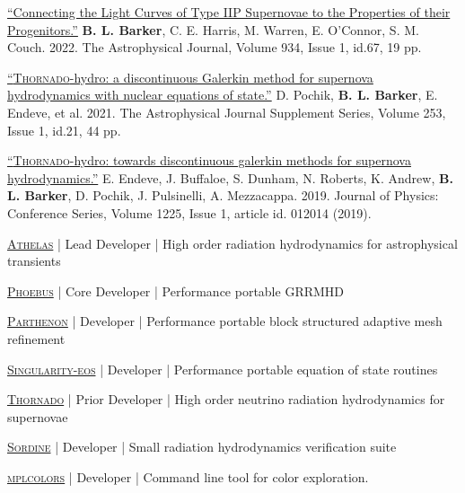 \documentclass[11pt]{vitae}
\begin{document}
\begin{publist}
\item \href{https://doi.org/10.3847/1538-4357/ac77f3}{``Connecting the Light Curves of Type IIP Supernovae to the Properties of their Progenitors.''} \textbf{B. L. Barker}, C. E. Harris, M. Warren, E. O'Connor, S. M. Couch. 2022. The Astrophysical Journal, Volume 934, Issue 1, id.67, 19 pp.

\item \href{https://iopscience.iop.org/article/10.3847/1538-4365/abd700}{``\textsc{Thornado}-hydro: a discontinuous Galerkin method for supernova hydrodynamics with nuclear equations of state.''} D. Pochik, \textbf{B. L. Barker}, E. Endeve, et al. 2021. The Astrophysical Journal Supplement Series, Volume 253, Issue 1, id.21, 44 pp.

\item \href{https://doi.org/10.1088/1742-6596/1225/1/012014}{``\textsc{Thornado}-hydro: towards discontinuous galerkin methods for supernova hydrodynamics.''} E. Endeve, J. Buffaloe, S. Dunham, N. Roberts, K. Andrew, \textbf{B. L. Barker}, D. Pochik, J. Pulsinelli, A. Mezzacappa. 2019. Journal of Physics: Conference Series, Volume 1225, Issue 1, article id. 012014 (2019).

\end{publist}

\begin{genericlist}
\item \href{https://github.com/astrobarker/athelas}{\textsc{Athelas}} | Lead Developer | 
  High order radiation hydrodynamics for astrophysical transients
\item \href{https://github.com/lanl/phoebus}{\textsc{Phoebus}} | Core Developer | 
  Performance portable GRRMHD
\item \href{https://github.com/parthenon-hpc-lab/parthenon}{\textsc{Parthenon}} | Developer | 
  Performance portable block structured adaptive mesh refinement
\item \href{https://github.com/lanl/singularity-eos}{\textsc{Singularity-eos}} | Developer | 
  Performance portable equation of state routines
\item \href{https://github.com/endeve/thornado}{\textsc{Thornado}} | Prior Developer | 
  High order neutrino radiation hydrodynamics for supernovae
\item \href{https://github.com/astrobarker/sordine}{\textsc{Sordine}} | Developer | 
  Small radiation hydrodynamics verification suite
\item \href{https://github.com/astrobarker/mplcolors}{\textsc{mplcolors}} | Developer | 
  Command line tool for color exploration.
\end{genericlist}
\end{document}
